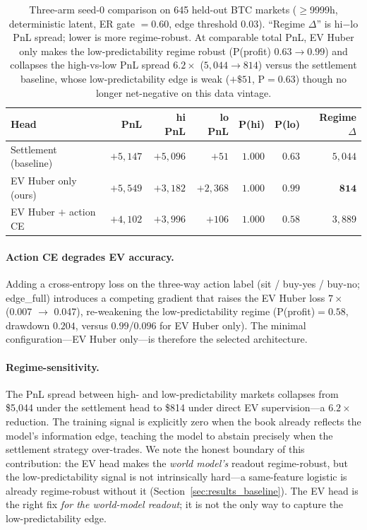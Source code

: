 \documentclass{article}
\begin{document}
\begin{table}[t]
\centering
\small
\begin{tabular}{lrrrrrr}
\toprule
Head & PnL & hi PnL & lo PnL & P(hi) & P(lo) & Regime $\Delta$ \\
\midrule
Settlement (baseline) & $+5{,}147$ & $+5{,}096$ & $+51$ & $1.000$ & $0.63$ & $5{,}044$ \\
EV Huber only (ours) & $+5{,}549$ & $+3{,}182$ & $+2{,}368$ & $1.000$ & $\mathbf{0.99}$ & $\mathbf{814}$ \\
EV Huber $+$ action CE & $+4{,}102$ & $+3{,}996$ & $+106$ & $1.000$ & $0.58$ & $3{,}889$ \\
\bottomrule
\end{tabular}
\caption{Three-arm seed-0 comparison on 645 held-out BTC markets
($\geq$9999h, deterministic latent, ER gate $=0.60$, edge threshold
$0.03$).  ``Regime $\Delta$'' is hi$-$lo PnL spread; lower is more
regime-robust.  At comparable total PnL, EV Huber only makes the
low-predictability regime robust (P(profit) $0.63\!\to\!0.99$) and collapses
the high-vs-low PnL spread $6.2{\times}$ ($5{,}044\!\to\!814$) versus the
settlement baseline, whose low-predictability edge is weak ($+\$51$, P$=0.63$)
though no longer net-negative on this data vintage.}
\label{tab:ev_arms}
\end{table}

\paragraph{Action CE degrades EV accuracy.}
Adding a cross-entropy loss on the three-way action label
(sit / buy-yes / buy-no; edge\_full) introduces a competing
gradient that raises the EV Huber loss $7{\times}$ (0.007 $\to$ 0.047),
re-weakening the low-predictability regime (P(profit)$=0.58$, drawdown
$0.204$, versus $0.99$/$0.096$ for EV Huber only).  The minimal
configuration---EV Huber only---is therefore the selected architecture.

\paragraph{Regime-sensitivity.}
The PnL spread between high- and low-predictability markets collapses from
\$5{,}044 under the settlement head to \$814 under direct EV
supervision---a $6.2{\times}$ reduction.  The training signal is explicitly
zero when the book already reflects the model's information edge, teaching
the model to abstain precisely when the settlement strategy over-trades.  We
note the honest boundary of this contribution: the EV head makes the
\emph{world model's} readout regime-robust, but the low-predictability signal
is not intrinsically hard---a same-feature logistic is already regime-robust
without it (Section~\ref{sec:results_baseline}).  The EV head is the right fix
\emph{for the world-model readout}; it is not the only way to capture the
low-predictability edge.
\end{document}
